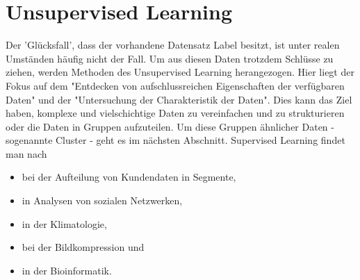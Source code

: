 \section{Unsupervised Learning}\label{sec:us1}
Der 'Glücksfall', dass der vorhandene Datensatz Label besitzt, ist unter realen Umständen häufig nicht der Fall. Um aus diesen Daten trotzdem Schlüsse zu ziehen, werden Methoden des Unsupervised Learning herangezogen. Hier liegt der Fokus auf dem "Entdecken von aufschlussreichen Eigenschaften der verfügbaren Daten"\citep[S.277; eigene Übersetzung]{kubat_introduction_2017} und der "Untersuchung der Charakteristik der Daten"\citep[S.~13; eigene Übersetzung]{kim_matlab_2017}. Dies kann das Ziel haben, komplexe und vielschichtige Daten zu vereinfachen und zu strukturieren\citep{ericson_how_2017} oder die Daten in Gruppen aufzuteilen\citep[S.~22]{lison_introduction_2012}. Um diese Gruppen ähnlicher Daten - sogenannte Cluster - geht es im nächsten Abschnitt.\newline
Supervised Learning findet man nach \citep[S.~223]{ramasubramanian_machine_2017}
\begin{itemize}
\item bei der Aufteilung von Kundendaten in Segmente,
\item in Analysen von sozialen Netzwerken,
\item in der Klimatologie,
\item bei der Bildkompression und
\item in der Bioinformatik.\citep[S.~6]{kauchak_zoterovoll2.pdf_2016}
\end{itemize}

